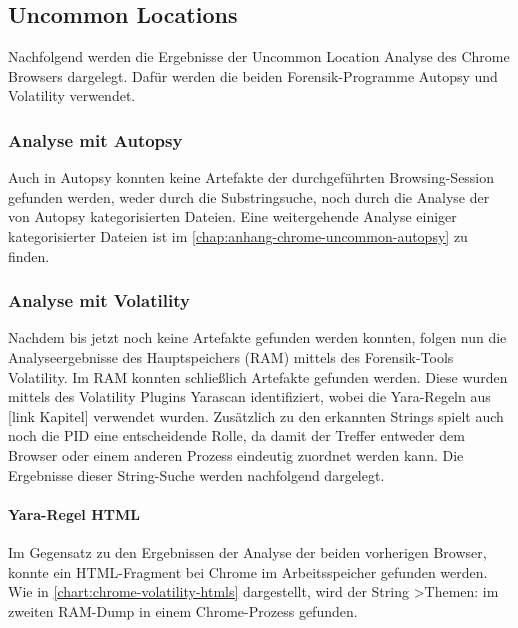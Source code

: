 \subsection*{Uncommon Locations}\label{chap:ergebnisse-chrome-uncommon-locations}

Nachfolgend werden die Ergebnisse der Uncommon Location Analyse des Chrome Browsers dargelegt. Dafür werden die beiden Forensik-Programme Autopsy und Volatility verwendet.

\subsubsection*{Analyse mit Autopsy}\label{chap:ergebnisse-chrome-uncommon-autopsy}

Auch in Autopsy konnten keine Artefakte der durchgeführten Browsing-Session gefunden werden, weder durch die Substringsuche, noch durch die Analyse der von Autopsy kategorisierten Dateien. Eine weitergehende Analyse einiger kategorisierter Dateien ist im \autoref{chap:anhang-chrome-uncommon-autopsy} zu finden.

\subsubsection*{Analyse mit Volatility}\label{chap:ergebnisse-chrome-uncommon-volatility}

Nachdem bis jetzt noch keine Artefakte gefunden werden konnten, folgen nun die Analyseergebnisse des Hauptspeichers (RAM) mittels des Forensik-Tools Volatility. Im RAM konnten schließlich Artefakte gefunden werden. Diese wurden mittels des Volatility Plugins Yarascan identifiziert, wobei die Yara-Regeln aus [link Kapitel] verwendet wurden. Zusätzlich zu den erkannten Strings spielt auch noch die PID eine entscheidende Rolle, da damit der Treffer entweder dem Browser oder einem anderen Prozess eindeutig zuordnet werden kann. Die Ergebnisse dieser String-Suche werden nachfolgend dargelegt.

\paragraph*{Yara-Regel \glqq{}HTML\grqq{}}\label{chap:ergebnisse-chrome-uncommon-volatility-html}

Im Gegensatz zu den Ergebnissen der Analyse der beiden vorherigen Browser, konnte ein HTML-Fragment bei Chrome im Arbeitsspeicher gefunden werden. Wie in \autoref{chart:chrome-volatility-htmls} dargestellt, wird der String \glqq{}>Themen:\grqq{} im zweiten RAM-Dump in einem Chrome-Prozess gefunden.

